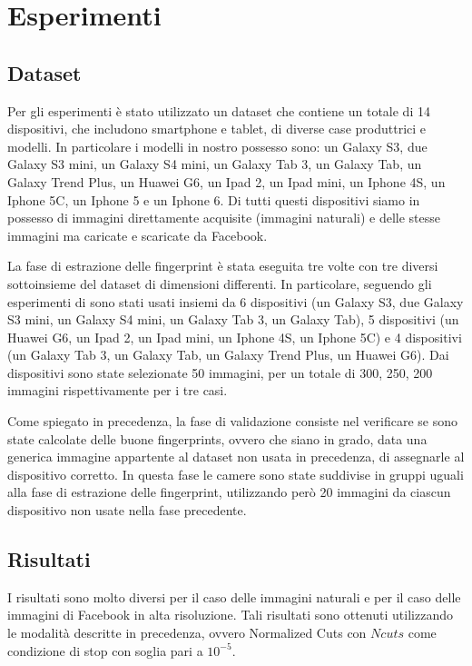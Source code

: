 \section{Esperimenti}

\subsection{Dataset}

Per gli esperimenti è stato utilizzato un dataset che contiene un totale di 14 dispositivi, che includono smartphone e tablet, di diverse case produttrici e modelli. In particolare i modelli in nostro possesso sono: un Galaxy S3, due Galaxy S3 mini, un Galaxy S4 mini, un Galaxy Tab 3, un Galaxy Tab, un Galaxy Trend Plus, un Huawei G6, un Ipad 2, un Ipad mini, un Iphone 4S, un Iphone 5C, un Iphone 5 e un Iphone 6. Di tutti questi dispositivi siamo in possesso di immagini direttamente acquisite (immagini naturali) e delle stesse immagini ma caricate e scaricate da Facebook.

La fase di estrazione delle fingerprint è stata eseguita tre volte con tre diversi sottoinsieme del dataset di dimensioni differenti. In particolare, seguendo gli esperimenti di \cite{ Amerini2014831} sono stati usati insiemi da 6 dispositivi (un Galaxy S3, due Galaxy S3 mini, un Galaxy S4 mini, un Galaxy Tab 3, un Galaxy Tab), 5 dispositivi (un Huawei G6, un Ipad 2, un Ipad mini, un Iphone 4S, un Iphone 5C) e 4 dispositivi (un Galaxy Tab 3, un Galaxy Tab, un Galaxy Trend Plus, un Huawei G6). Dai dispositivi sono state selezionate 50 immagini, per un totale di 300, 250, 200 immagini rispettivamente per i tre casi.

Come spiegato in precedenza, la fase di validazione consiste nel verificare se sono state calcolate delle buone fingerprints, ovvero che siano in grado, data una generica immagine appartente al dataset non usata in precedenza, di assegnarle al dispositivo corretto. In questa fase le camere sono state suddivise in gruppi uguali alla fase di estrazione delle fingerprint, utilizzando però 20 immagini da ciascun dispositivo non usate nella fase precedente.

\subsection{Risultati}

I risultati sono molto diversi per il caso delle immagini naturali e per il caso delle immagini di Facebook in alta risoluzione. Tali risultati sono ottenuti utilizzando le modalità descritte in precedenza, ovvero Normalized Cuts con $Ncuts$ come condizione di stop con soglia pari a $10^{-5}$.


